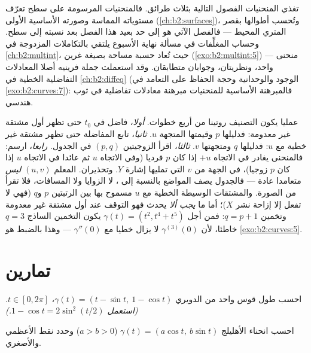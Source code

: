 \begin{remark}
تغذي المنحنيات الفصول التالية بثلاث طرائق. فالمنحنيات المرسومة على
سطح تعرّف مستوياته المماسة وصورته الأساسية الأولى (\cref{ch:b2:surfaces})، وتُحسب
أطوالها بقصر المتري المحيط --- فالفصل الآتي هو إلى حد بعيد هذا
الفصل بعد نسبته إلى سطح. وحساب المغلِّفات في مسألة نهاية الأسبوع
يلتقي بالتكاملات المزدوجة في \cref{ch:b2:multint}، حيث تُعاد حسبة مساحة 
بصيغة غرين (\cref{exo:b2:multint:5}) --- منحنى واحد، ونظريتان، وجوابان متطابقان.
وقد استعملت جملة فرينيه أصلا المعادلات التفاضلية الخطية في \cref{ch:b2:diffeq}
(الوجود والوحدانية وحجة الحفاظ على التعامد في \cref{exo:b2:curves:7}): فالمبرهنة
الأساسية للمنحنيات مبرهنة معادلات تفاضلية في ثوب هندسي.
\end{remark}

\begin{remark}
عمليا يكون التصنيف روتينا من أربع خطوات. \emph{أولا}، فاضل في $t_0$
حتى تظهر أول مشتقة غير معدومة: فدليلها $p$ وقيمتها المتجهة $u$.
\emph{ثانيا}، تابع المفاضلة حتى تظهر مشتقة غير خطية مع $u$:
فدليلها $q$ ومتجهتها $v$. \emph{ثالثا}، اقرأ الزوجيتين $(p, q)$
في الجدول. \emph{رابعا}، ارسم: فالمنحنى يغادر في الاتجاه $+u$ إذا
كان $p$ فرديا (وفي الاتجاه $u$ ثم عائدا في الاتجاه $u$
إذا كان $p$ زوجيا)، في الجهة من $v$ التي تمليها إشارة $Y$.
وتحذيران. المعلم $(u, v)$ \emph{ليس} متعامدا عادة --- فالجدول يصف
المواضع بالنسبة إلى ، لا الزوايا ولا المسافات، فلا تقرأ
 من الصورة. والمشتقات الوسيطة الخطية مع $u$ مسموح بها
بين الرتبتين $p$ و$q$ (فهي لا تفعل إلا إزاحة نشر $X$)؛ أما
ما \emph{يجب ألا} يحدث فهو التوقف عند أول مشتقة غير معدومة وتخمين
$q = p + 1$: فمن أجل $\gamma(t)
= (t^2, t^4 + t^5)$ يكون التخمين الساذج $q = 3$ خاطئا، لأن $\gamma^{(3)}(0)$
لا يزال خطيا مع $\gamma''(0)$ --- وهذا بالضبط هو \cref{exo:b2:curves:5}.
\end{remark}

\section{تمارين}

\begin{exercise}[$\star$]\label{exo:b2:curves:1}
احسب طول قوس واحد من الدويري $\gamma(t) = (t -
\sin t,\ 1 - \cos t)$، $t \in [0, 2\pi]$. \emph{(استعمل $1 - \cos t =
2\sin^2(t/2)$.)}
\end{exercise}

\begin{exercise}[$\star$]\label{exo:b2:curves:2}
احسب انحناء الأهليلج $\gamma(t) = (a\cos t,\ b\sin
t)$ ($a > b > 0$) وحدد نقط  الأعظمي
والأصغري.
\end{exercise}

